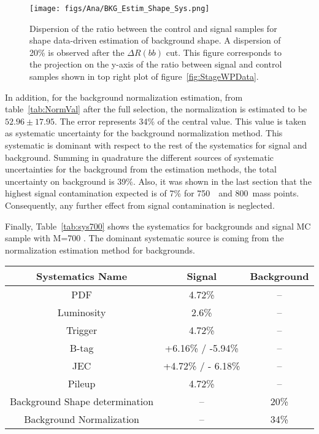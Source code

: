\begin{figure}[!Hhtbp]
  \begin{center}
    \texttt{[image: figs/Ana/BKG\_Estim\_Shape\_Sys.png]}
    \caption{Dispersion of the ratio between the control and signal samples for shape data-driven estimation of background shape. A dispersion of 20\% is observed after the $\Delta R (bb)$ cut. This figure corresponds to the projection on the y-axis of the ratio between signal and control samples shown in top right plot of figure~\ref{fig:StageWPData}.}
    \label{fig:ShapeSys}
  \end{center}
\end{figure}

In addition, for the background normalization estimation, from table~\ref{tab:NormVal} after the full selection, the normalization is estimated to be $52.96\pm17.95$. The error represents 34\% of the central value. This value is taken as systematic uncertainty for the background normalization method. This systematic is dominant with respect to the rest of the systematics for signal and background. Summing in quadrature the different sources of systematic uncertainties for the background from the estimation methods, the total uncertainty on background is 39\%. Also, it was shown in the last section that the highest signal contamination expected is of 7\% for 750~\GeVcc~and 800~\GeVcc mass points. Consequently, any further effect from signal contamination is neglected.

Finally, Table~\ref{tab:sys700} shows the systematics for backgrounds and signal MC sample with M=700 \GeVcc. The dominant systematic source is coming from the normalization estimation method for backgrounds.

\begin{table*}[htbH]
\begin{center}
\begin{tabular}{|c|c|c|}
\hline 
Systematics Name & Signal & Background \\
\hline
PDF & 4.72\% & --\\
Luminosity & 2.6\% & --\\
Trigger & 4.72\% & --\\
B-tag & +6.16\% / -5.94\% & --\\
JEC & +4.72\% / - 6.18\% & --\\
Pileup & 4.72\% & --\\
Background Shape determination & -- & 20\%\\
Background Normalization & -- & 34\%\\
\hline
\end{tabular}
\caption{Summary of the uncertainties in the case of the signal yield for the mass point at 700~GeV/$c^{2}$ and for background yields.\label{tab:sys700}}
\end{center}
\end{table*}

